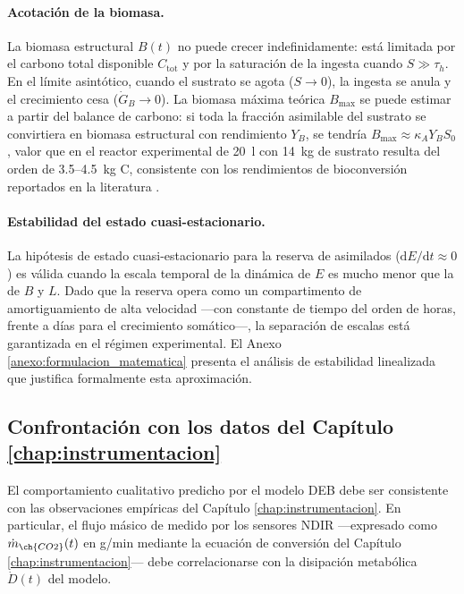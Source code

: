 \paragraph{Acotación de la biomasa.} La biomasa estructural $B(t)$ no puede crecer indefinidamente: está limitada por el carbono total disponible $C_{\mathrm{tot}}$ y por la saturación de la ingesta cuando $S \gg \tau_h$. En el límite asintótico, cuando el sustrato se agota ($S \to 0$), la ingesta se anula y el crecimiento cesa ($\dot{G}_B \to 0$). La biomasa máxima teórica $B_{\max}$ se puede estimar a partir del balance de carbono: si toda la fracción asimilable del sustrato se convirtiera en biomasa estructural con rendimiento $Y_B$, se tendría $B_{\max} \approx \kappa_A Y_B S_0$, valor que en el reactor experimental de \SI{20}{\litre} con \SI{14}{\kilo\gram} de sustrato resulta del orden de \SI{3.5}{}--\SI{4.5}{\kilo\gram} C, consistente con los rendimientos de bioconversión reportados en la literatura \parencite{dienerConversionOrganicMaterial2011,parodiBioconversionEfficienciesGreenhouse2020a}.

\paragraph{Estabilidad del estado cuasi-estacionario.} La hipótesis de estado cuasi-estacionario para la reserva de asimilados ($\mathrm{d}E/\mathrm{d}t \approx 0$) es válida cuando la escala temporal de la dinámica de $E$ es mucho menor que la de $B$ y $L$. Dado que la reserva opera como un compartimento de amortiguamiento de alta velocidad —con constante de tiempo del orden de horas, frente a días para el crecimiento somático—, la separación de escalas está garantizada en el régimen experimental. El Anexo \ref{anexo:formulacion_matematica} presenta el análisis de estabilidad linealizada que justifica formalmente esta aproximación.

\subsection{Confrontación con los datos del Capítulo \ref{chap:instrumentacion}}
\label{subsec:cap3_confrontacion}

El comportamiento cualitativo predicho por el modelo DEB debe ser consistente con las observaciones empíricas del Capítulo \ref{chap:instrumentacion}. En particular, el flujo másico de  medido por los sensores NDIR —expresado como $\dot{m}_{\ch{CO2}}(t)$ en g/min mediante la ecuación de conversión del Capítulo \ref{chap:instrumentacion}— debe correlacionarse con la disipación metabólica $\dot{D}(t)$ del modelo.

